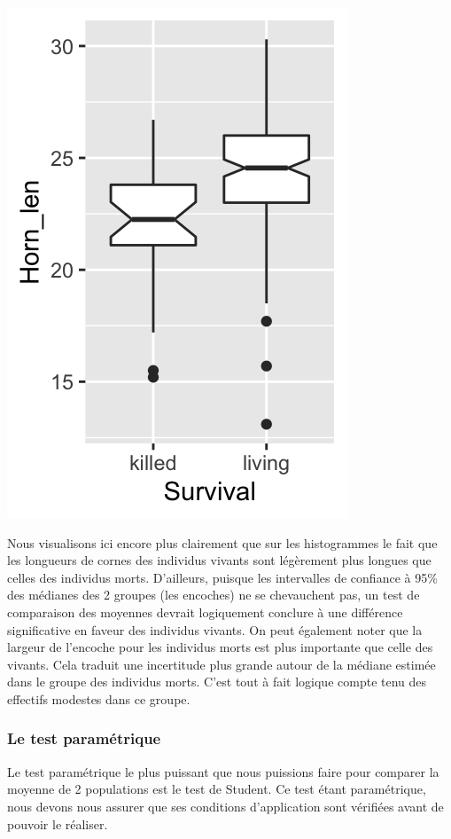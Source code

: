 \documentclass[a4paperpaper,]{article}
\newenvironment{Shaded}{\begin{snugshade}}{\end{snugshade}}
\newcommand{\DataTypeTok}[1]{\textcolor[rgb]{0.00,0.34,0.68}{#1}}
\newcommand{\KeywordTok}[1]{\textcolor[rgb]{0.12,0.11,0.11}{\textbf{#1}}}
\newcommand{\NormalTok}[1]{\textcolor[rgb]{0.12,0.11,0.11}{#1}}
\newcommand{\OperatorTok}[1]{\textcolor[rgb]{0.12,0.11,0.11}{#1}}
\newcommand{\OtherTok}[1]{\textcolor[rgb]{0.00,0.43,0.16}{#1}}
\newcommand{\StringTok}[1]{\textcolor[rgb]{0.75,0.01,0.01}{#1}}
\begin{document}
\begin{Shaded}
\end{Shaded}

\begin{center}\includegraphics[width=0.25\linewidth]{figure/unnamed-chunk-51-1} \end{center}

Nous visualisons ici encore plus clairement que sur les histogrammes le fait que les longueurs de cornes des individus vivants sont légèrement plus longues que celles des individus morts. D'ailleurs, puisque les intervalles de confiance à 95\% des médianes des 2 groupes (les encoches) ne se chevauchent pas, un test de comparaison des moyennes devrait logiquement conclure à une différence significative en faveur des individus vivants. On peut également noter que la largeur de l'encoche pour les individus morts est plus importante que celle des vivants. Cela traduit une incertitude plus grande autour de la médiane estimée dans le groupe des individus morts. C'est tout à fait logique compte tenu des effectifs modestes dans ce groupe.

\hypertarget{le-test-paramuxe9trique-2}{%
\subsubsection{Le test paramétrique}\label{le-test-paramuxe9trique-2}}

Le test paramétrique le plus puissant que nous puissions faire pour comparer la moyenne de 2 populations est le test de Student. Ce test étant paramétrique, nous devons nous assurer que ses conditions d'application sont vérifiées avant de pouvoir le réaliser.
\end{document}
